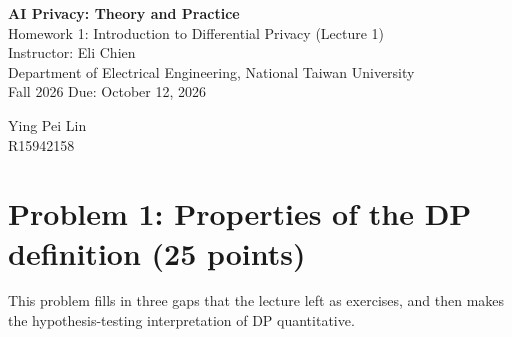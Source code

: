 \documentclass[11pt]{article}
\newcommand{\problem}[2]{\section*{#1 \hfill\normalsize(#2)}}
\begin{document}
\begin{center}
  {\LARGE\bfseries AI Privacy: Theory and Practice}\\[6pt]
  {\Large Homework 1: Introduction to Differential Privacy (Lecture 1)}\\[8pt]
  Instructor: Eli Chien\\
  Department of Electrical Engineering, National Taiwan University\\[4pt]
  Fall 2026 \qquad Due: October 12, 2026
\end{center}

\vspace{4pt}
\noindent{} Ying Pei Lin \\
 R15942158

\problem{Problem 1: Properties of the DP definition}{25 points}

This problem fills in three gaps that the lecture left as exercises, and then
makes the hypothesis-testing interpretation of DP quantitative.
\end{document}
